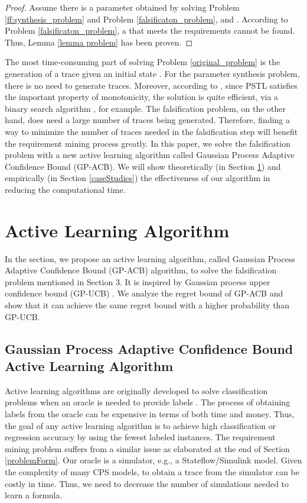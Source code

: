 \documentclass[10pt]{article}
\theoremstyle{plain}
\begin{document}
\begin{proof} \renewcommand{\qedsymbol}{}
Assume there is a parameter  obtained by solving Problem \ref{ff:synthesis_problem} and Problem \ref{falsificaton_problem}, and . According to Problem \ref{falsificaton_problem}, a  that meets the requirements cannot be found. Thus, Lemma \ref{lemma problem} has been proven. 
\end{proof}

The most time-consuming part of solving Problem \ref{original_problem} is the generation of a trace given an initial state . For the parameter synthesis problem, there is no need to generate traces. Moreover, according to \cite{jin2013mining}, since PSTL satisfies the important property of monotonicity, the solution is quite efficient, via a binary search algorithm \cite{dreossi2015efficient}, for example. The falsification problem, on the other hand, does need a large number of traces being generated. Therefore, finding a way to minimize the number of traces needed in the falsification step will benefit the requirement mining process greatly. In this paper, we solve the falsification problem with a new active learning algorithm called Gaussian Process Adaptive Confidence Bound (GP-ACB). We will show theoretically (in Section \ref{active_learning}) and empirically (in Section \ref{caseStudies}) the effectiveness of our algorithm in reducing the computational time.


\section{Active Learning Algorithm}
\label{active_learning}

In the section, we propose an active learning algorithm, called Gaussian Process Adaptive Confidence Bound (GP-ACB) algorithm, to solve the falsification problem mentioned in Section 3. It is inspired by Gaussian process upper confidence bound (GP-UCB) \cite{srinivas2012information}. We analyze the regret bound of GP-ACB and show that it can achieve the same regret bound with a higher probability than GP-UCB.




\subsection{Gaussian Process Adaptive Confidence Bound Active Learning Algorithm}



Active learning algorithms are originally developed to solve classification problems when an oracle is needed to provide labels \cite{Settles2010}. The process of obtaining labels from the oracle can be expensive in terms of both time and money. Thus, the goal of any active learning algorithm is to achieve high classification or regression accuracy by using the fewest labeled instances. The requirement mining problem suffers from a similar issue as elaborated at the end of Section \ref{problemForm}. Our oracle is a simulator, e.g., a Stateflow/Simulink model. Given the complexity of many CPS models, to obtain a trace from the simulator can be costly in time. Thus, we need to decrease the number of simulations needed to learn a formula.  
\end{document}
